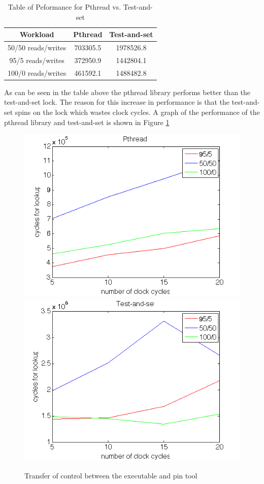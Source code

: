 \documentclass{article}
\begin{document}
\begin{table}[h]\centering
\begin{tabular}{|ccc|} 
\hline
Workload & Pthread & Test-and-set\\
\hline
50/50 reads/writes & 703305.5 & 1978526.8\\
95/5 reads/writes & 372950.9 & 1442804.1\\
100/0 reads/writes & 461592.1 & 1488482.8\\
\hline
\end{tabular}
\caption{Table of Peformance for Pthread vs. Test-and-set}
\label{table:comp}
\end{table}


As can be seen in the table above the pthread library performs better than the test-and-set lock.
The reason for this increase in performance is that the test-and-set spins on the lock which wastes clock cycles.
A graph of the performance of the pthread library and test-and-set is shown in Figure \ref{pthreadvsts}

\begin{figure}[H]
\begin{center}
\includegraphics[scale=0.5]{images/pthread}
\includegraphics[scale=0.5]{images/test-and-set}
\end{center}
\caption{Transfer of control between the executable and pin tool}
\label{pthreadvsts}
\end{figure}
\end{document}
